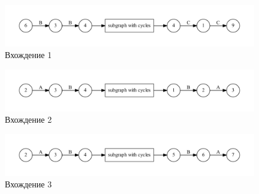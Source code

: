 \documentclass[a5paper]{article}
\begin{document}
\begin{figure}
    \begin{center}
        \includegraphics[width=11cm]{out1.pdf}
        \caption{Вхождение 1}
        \label{pic1}        
    \end{center}
\end{figure}

\begin{figure}
    \begin{center}
        \includegraphics[width=11cm]{out2.pdf}
        \caption{Вхождение 2}
        \label{pic1}        
    \end{center}
\end{figure}

\begin{figure}
    \begin{center}
        \includegraphics[width=11cm]{out3.pdf}
        \caption{Вхождение 3}
        \label{pic1}        
    \end{center}
\end{figure}


  


\end{document}
